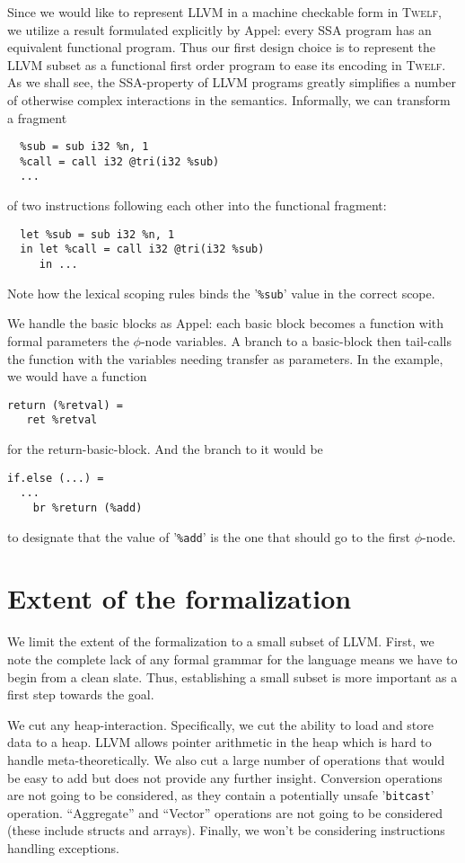 \documentclass[a4paper, oneside, 10pt, draft]{memoir}
\newcommand{\twelf}{\textsc{Twelf}}
\begin{document}
Since we would like to represent LLVM in a machine checkable form in
\twelf{}, we utilize a result formulated explicitly by
Appel\cite{appel:1998:modern, appel:1998:ssa}: every SSA program has
an equivalent functional program. Thus our first design choice is to
represent the LLVM subset as a functional first order program to ease
its encoding in \twelf{}. As we shall see, the SSA-property of LLVM
programs greatly simplifies a number of otherwise complex interactions
in the semantics. Informally, we can transform a fragment
\label{llvm-consideration-let}
\begin{verbatim}
  %sub = sub i32 %n, 1
  %call = call i32 @tri(i32 %sub)
  ...
\end{verbatim}
of two instructions following each other into the functional fragment:
\begin{verbatim}
  let %sub = sub i32 %n, 1
  in let %call = call i32 @tri(i32 %sub)
     in ...
\end{verbatim}

Note how the lexical scoping rules binds the '\texttt{\%sub}' value
in the correct scope.

We handle the basic blocks as Appel: each basic block becomes a
function with formal parameters the $\phi$-node variables. A branch to
a basic-block then tail-calls the function with the variables needing
transfer as parameters. In the example, we would have a function
\begin{verbatim}
return (%retval) =
   ret %retval
\end{verbatim}
for the return-basic-block. And the branch to it would be
\begin{verbatim}
if.else (...) =
  ...
    br %return (%add)
\end{verbatim}
to designate that the value of '\texttt{\%add}' is the one that should
go to the first $\phi$-node.

\section{Extent of the formalization}

We limit the extent of the formalization to a small subset of
LLVM. First, we note the complete lack of any formal grammar for
the language means we have to begin from a clean slate. Thus,
establishing a small subset is more important as a first step towards
the goal.

We cut any heap-interaction. Specifically, we cut the ability to
load and store data to a heap. LLVM allows pointer arithmetic in the
heap which is hard to handle meta-theoretically. We also cut a large
number of operations that would be easy to add but does not provide
any further insight. Conversion operations are not going to be
considered, as they contain a potentially unsafe '\texttt{bitcast}'
operation. ``Aggregate'' and ``Vector'' operations are not going to be
considered (these include structs and arrays). Finally, we won't be
considering instructions handling exceptions.
\end{document}
